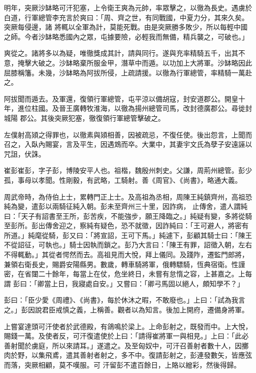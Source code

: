 \begin{pinyinscope}
 明年，突厥沙缽略可汗犯塞，上令衛王爽為元帥，率眾擊之，以徹為長史。遇虜於白道，行軍總管李充言於爽曰：「周、齊之世，有同戰國，中夏力分，其來久矣。突厥每侵邊，諸
 將輒以全軍為計，莫能死戰。由是突厥勝多敗少，所以每輕中國之師。今者沙缽略悉國內之眾，屯據要險，必輕我而無備，精兵襲之，可破也。」



 爽從之。諸將多以為疑，唯徹獎成其計，請與同行。遂與充率精騎五千，出其不意，掩擊大破之。沙缽略棄所服金甲，潛草中而遁。以功加上大將軍。沙缽略因此屈膝稱籓。未幾，沙缽略為阿拔所侵，上疏請援。以徹為行軍總管，率精騎一萬赴之。



 阿拔聞而遁去。及軍還，復領行軍總管，屯平涼以備胡寇，封安道郡公。開皇十年，進位柱國。及晉王廣轉牧淮海，以徹為揚州總管司馬，改封德廣郡公。尋徙封城陽
 郡公。其後突厥犯塞，徹復領行軍總管擊破之。



 左僕射高熲之得罪也，以徹素與熲相善，因被疏忌，不復任使。後出怨言，上聞而召之，入臥內賜宴，言及平生，因遇鴆而卒。大業中，其妻宇文氏為孽子安遠誣以咒詛，伏誅。



 崔彭崔彭，字子彭，博陵安平人也。祖楷，魏殷州刺史。父謙，周荊州總管。彭少孤，事母以孝聞。性剛毅，有武略，工騎射。善《周官》、《尚書》，略通大義。



 周武帝時，為侍伯上士，累轉門正上士。及高祖為丞相，周陳王純鎮齊州，高祖恐純為變，遣彭以兩騎征純入朝。彭未至齊州三十里，因詐病，
 止傳舍，遣人謂純曰：「天子有詔書至王所，彭苦疾，不能強步，願王降臨之。」純疑有變，多將從騎至彭所。彭出傳舍迎之，察純有疑色，恐不就徵，因詐純曰：「王可避人，將密有所道。」純麾從騎，彭又曰：「將宣詔，王可下馬。」純遽下，彭顧其騎士曰：「陳王不從詔征，可執也。」騎士因執而鎖之。彭乃大言曰：「陳王有罪，詔徵入朝，左右不得輒動。」其從者愕然而去。高祖見而大悅，拜上儀同。及踐阼，遷監門郎將，兼領右衛長史，賜爵安陽縣男。數歲，轉車騎將軍，俄轉驃騎，恆典宿衛。性謹密，在省闥二十餘年，每當上在仗，危坐終日，未嘗有怠惰之容，上甚嘉之。上每謂
 彭曰：「卿當上日，我寢處自安。」又嘗曰：「卿弓馬固以絕人，頗知學不？」



 彭曰：「臣少愛《周禮》、《尚書》，每於休沐之暇，不敢廢也。」上曰：「試為我言之。」彭因說君臣戒慎之義，上稱善。觀者以為知言。後加上開府，遷備身將軍。



 上嘗宴達頭可汗使者於武德殿，有鴿鳴於梁上。上命彭射之，既發而中。上大悅，賜錢一萬。及使者反，可汗復遣使於上曰：「請得崔將軍一與相見。」上曰：「此必善射聞於虜庭，所以來請耳。」遂遣之。及至匈奴中，可汗召善射者數十人，因擲肉於野，以集飛鳶，遣其善射者射之，多不中。復請彭射之，彭連發數矢，皆應弦而落，突厥相顧，莫不嘆服。可
 汗留彭不遣百餘日，上賂以繒彩，然後得歸。




\end{pinyinscope}
